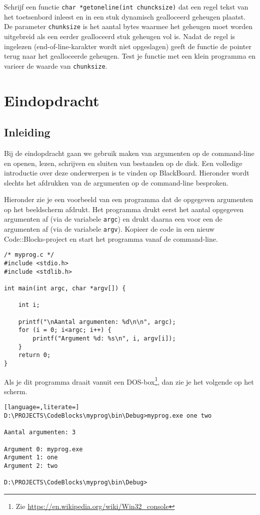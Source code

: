 \documentclass[a4paper,10pt,fleqn,twoside]{article}
\begin{document}
Schrijf een functie \lstinline|char *getoneline(int chuncksize)| dat een regel tekst van het toetsenbord inleest en in een stuk dynamisch gealloceerd geheugen plaatst. De parameter \lstinline|chunksize| is het aantal bytes waarmee het geheugen moet worden uitgebreid als een eerder gealloceerd stuk geheugen vol is. Nadat de regel is ingelezen (end-of-line-karakter wordt niet opgeslagen) geeft de functie de pointer terug naar het gealloceerde geheugen. Test je functie met een klein programma en varieer de waarde van \lstinline|chunksize|.


\section{Eindopdracht}

\subsection{Inleiding}
Bij de eindopdracht gaan we gebruik maken van argumenten op de command-line en openen, lezen, schrijven en sluiten van bestanden op de disk. Een volledige introductie over deze onderwerpen is te vinden op BlackBoard. Hieronder wordt slechts het afdrukken van de argumenten op de command-line besproken.

Hieronder zie je een voorbeeld van een programma dat de opgegeven argumenten op het beeldscherm afdrukt. Het programma drukt eerst het aantal opgegeven argumenten af (via de variabele \lstinline|argc|) en drukt daarna een voor een de argumenten af (via de variabele \lstinline|argv|).
Kopieer de code in een nieuw Code::Blocks-project en start het programma vanaf de command-line.

\begin{lstlisting}
/* myprog.c */
#include <stdio.h>
#include <stdlib.h>

int main(int argc, char *argv[]) {

    int i;

    printf("\nAantal argumenten: %d\n\n", argc);
    for (i = 0; i<argc; i++) {
        printf("Argument %d: %s\n", i, argv[i]);
    }
    return 0;
}
\end{lstlisting}

Als je dit programma draait vanuit een DOS-box\footnote{Zie \url{https://en.wikipedia.org/wiki/Win32_console}}, dan zie je het volgende op het scherm.

\begin{lstlisting}[language=,literate=]
D:\PROJECTS\CodeBlocks\myprog\bin\Debug>myprog.exe one two

Aantal argumenten: 3

Argument 0: myprog.exe
Argument 1: one
Argument 2: two

D:\PROJECTS\CodeBlocks\myprog\bin\Debug>
\end{lstlisting}
\end{document}
